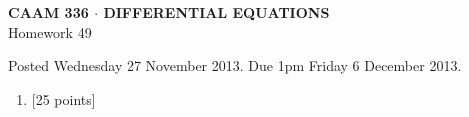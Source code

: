 \documentclass[10pt]{article}
\begin{document}
\vspace*{-5em}
\begin{center}
\large \textsf{\textbf{CAAM 336 $\cdot$ DIFFERENTIAL EQUATIONS}\\[0.5em]
Homework 49 }
\end{center}

Posted Wednesday 27 November 2013.  Due 1pm Friday 6 December 2013.

\begin{enumerate}\addtocounter{enumi}{48}
\item {[25 points]}  
\end{enumerate}
\end{document}
